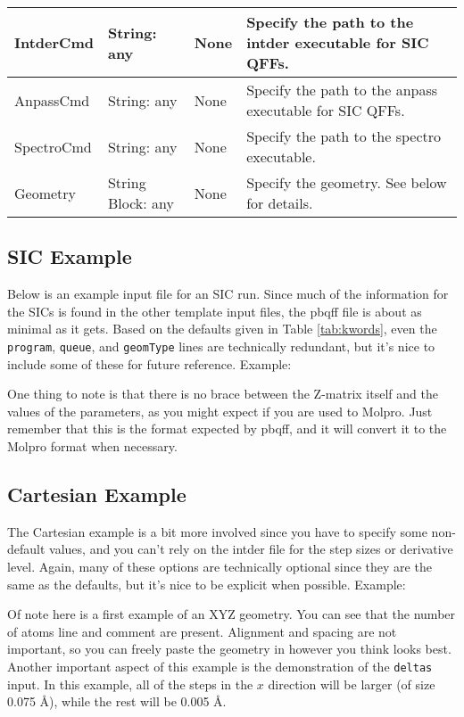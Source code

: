 \documentclass{article}
\begin{document}
\begin{table}[ht]
\begin{tabular}{|l|>{\raggedright}p{}|l|p{}|}
    \hline
    IntderCmd                     & String: any & None & Specify the path to the intder executable for SIC QFFs.\\
    \hline
    AnpassCmd                     & String: any & None & Specify the path to the anpass executable for SIC QFFs.\\
    \hline
    SpectroCmd                    & String: any & None & Specify the path to the spectro executable.\\
    \hline
    Geometry                      & String Block: any & None & Specify the geometry. See below for details.\\
    \hline
  \end{tabular}
\end{table}

\subsection{SIC Example}

Below is an example input file for an SIC run. Since much of the
information for the SICs is found in the other template input files,
the pbqff file is about as minimal as it gets. Based on the defaults
given in Table \ref{tab:kwords}, even the \verb|program|,
\verb|queue|, and \verb|geomType| lines are technically redundant, but
it's nice to include some of these for future reference. Example:



One thing to note is that there is no brace between the Z-matrix
itself and the values of the parameters, as you might expect if you
are used to Molpro. Just remember that this is the format expected by
pbqff, and it will convert it to the Molpro format when necessary.

\subsection{Cartesian Example}

The Cartesian example is a bit more involved since you have to specify
some non-default values, and you can't rely on the intder file for the
step sizes or derivative level. Again, many of these options are
technically optional since they are the same as the defaults, but it's
nice to be explicit when possible. Example:



Of note here is a first example of an XYZ geometry. You can see that
the number of atoms line and comment are present. Alignment and
spacing are not important, so you can freely paste the geometry in
however you think looks best. Another important aspect of this example
is the demonstration of the \verb|deltas| input. In this example, all
of the steps in the $x$ direction will be larger (of size 0.075
\AA{}), while the rest will be 0.005 \AA{}.
\end{document}
